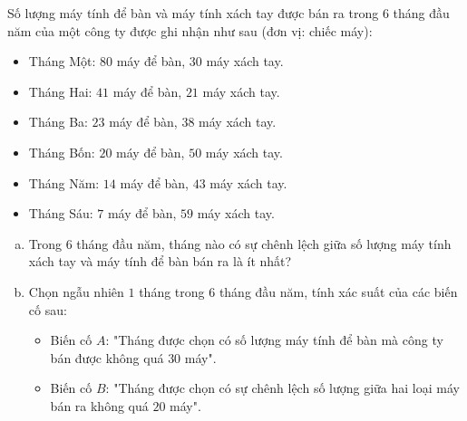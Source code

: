 \begin{bt}%
Số lượng máy tính để bàn và máy tính xách tay được bán ra trong $6$ tháng đầu năm của một công ty được ghi nhận như sau (đơn vị: chiếc máy):
\begin{itemize}
	\item Tháng Một: $80$ máy để bàn, $30$ máy xách tay.
	\item Tháng Hai: $41$ máy để bàn, $21$ máy xách tay.
	\item Tháng Ba: $23$ máy để bàn, $38$ máy xách tay.
	\item Tháng Bốn: $20$ máy để bàn, $50$ máy xách tay.
	\item Tháng Năm: $14$ máy để bàn, $43$ máy xách tay.
	\item Tháng Sáu: $7$ máy để bàn, $59$ máy xách tay.
\end{itemize}
\begin{enumerate}[a)]
	\item Trong $6$ tháng đầu năm, tháng nào có sự chênh lệch giữa số lượng máy tính xách tay và máy tính để bàn bán ra là ít nhất?
	\item Chọn ngẫu nhiên $1$ tháng trong $6$ tháng đầu năm, tính xác suất của các biến cố sau:
	\begin{itemize}
		\item Biến cố $A$: "Tháng được chọn có số lượng máy tính để bàn mà công ty bán được không quá $30$ máy".
		\item Biến cố $B$: "Tháng được chọn có sự chênh lệch số lượng giữa hai loại máy bán ra không quá $20$ máy".
	\end{itemize}
\end{enumerate}
\end{bt}
